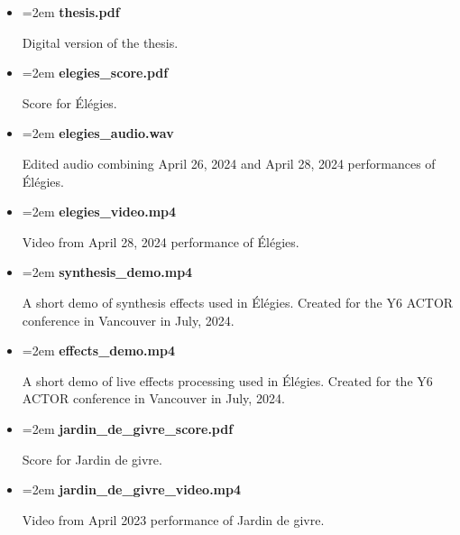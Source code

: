 \documentclass[12pt,twoside,maitrise]{dms_ks}
\theoremstyle{definition}
\begin{document}
{\begin{itemize}
    \setlength\itemsep{0.5em}  %
    \setlength\parskip{0pt}    %
    \setlength\parsep{0pt}
    \setlength\leftskip{0pt}   %
    \setlength{\labelsep}{0pt} %
    \renewcommand{\labelitemi}{} %
    \renewcommand{\labelitemii}{} %

    \item \hangindent=2em \textbf{thesis.pdf}
    \par Digital version of the thesis.
     
    \item \hangindent=2em \textbf{elegies\_score.pdf}
    \par Score for Élégies.
    
    \item \hangindent=2em \textbf{elegies\_audio.wav}
    \par Edited audio combining April 26, 2024 and April 28, 2024 performances of Élégies.
    
    \item \hangindent=2em \textbf{elegies\_video.mp4}
    \par Video from April 28, 2024 performance of Élégies.
    
    \item \hangindent=2em \textbf{synthesis\_demo.mp4}
    \par A short demo of synthesis effects used in Élégies. Created for the Y6 ACTOR conference in Vancouver in July, 2024.
    
    \item \hangindent=2em \textbf{effects\_demo.mp4}
    \par A short demo of live effects processing used in Élégies. Created for the Y6 ACTOR conference in Vancouver in July, 2024.

    \item \hangindent=2em \textbf{jardin\_de\_givre\_score.pdf}
    \par Score for Jardin de givre.
    
    \item \hangindent=2em \textbf{jardin\_de\_givre\_video.mp4}
    \par Video from April 2023 performance of Jardin de givre.
\end{itemize}


}
\end{document}
